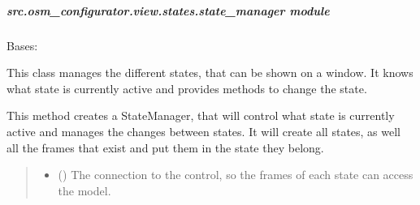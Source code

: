 \documentclass[letterpaper,10pt,english]{sphinxmanual}
\begin{document}
\subparagraph{src.osm\_configurator.view.states.state\_manager module}
\label{\detokenize{apidoc/src.osm_configurator.view.states:module-src.osm_configurator.view.states.state_manager}}\label{\detokenize{apidoc/src.osm_configurator.view.states:src-osm-configurator-view-states-state-manager-module}}

\begin{fulllineitems}
\label{\detokenize{apidoc/src.osm_configurator.view.states:src.osm_configurator.view.states.state_manager.StateManager}}
\pysigstartsignatures
{}
\pysigstopsignatures
\sphinxAtStartPar
Bases: 

\sphinxAtStartPar
This class manages the different states, that can be shown on a window.
It knows what state is currently active and provides methods to change the state.

\begin{fulllineitems}
\label{\detokenize{apidoc/src.osm_configurator.view.states:src.osm_configurator.view.states.state_manager.StateManager.__init__}}
\pysigstartsignatures
{}
\pysigstopsignatures
\sphinxAtStartPar
This method creates a StateManager, that will control what state is currently active and manages
the changes between states.
It will create all states, as well all the frames that exist and put them in the state they belong.
\begin{quote}\begin{description}
\begin{itemize}
\item {} 
\sphinxAtStartPar
{} ({\hyperref[\detokenize{apidoc/src.osm_configurator.control:src.osm_configurator.control.control_interface.IControl}]{}}) \textendash{} The connection to the control, so the frames of each state can access the model.


\end{itemize}
\end{description}
\end{quote}
\end{fulllineitems}
\end{fulllineitems}
\end{document}
